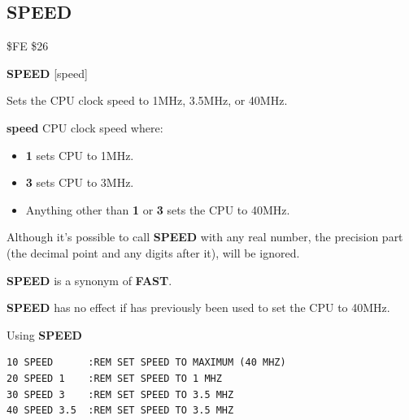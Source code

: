 
\newpage
\subsection{SPEED}
\begin{description}[leftmargin=2cm,style=nextline]
\item [Token:] \$FE \$26
\item [Format:] {\bf SPEED} [speed]
\item [Usage:] Sets the CPU clock speed to 1MHz, 3.5MHz, or 40MHz.

               {\bf speed} CPU clock speed where:
               \begin{itemize}
                   \item {\bf 1} sets CPU to 1MHz.
                   \item {\bf 3} sets CPU to 3MHz.
                   \item Anything other than {\bf 1} or {\bf 3} sets the CPU to 40MHz.
               \end{itemize}
\item [Remarks:] Although it's possible to call {\bf SPEED}
                 with any real number, the precision part (the decimal point
                 and any digits after it), will be ignored.

                {\bf SPEED} is a synonym of {\bf FAST}.

                {\bf SPEED} has no effect if 
                has previously been used to set the CPU to 40MHz.

\item [Example:] Using {\bf SPEED}
\begin{tcolorbox}[colback=black,coltext=white]
\verbatimfont{\codefont}
\begin{verbatim}
10 SPEED      :REM SET SPEED TO MAXIMUM (40 MHZ)
20 SPEED 1    :REM SET SPEED TO 1 MHZ
30 SPEED 3    :REM SET SPEED TO 3.5 MHZ
40 SPEED 3.5  :REM SET SPEED TO 3.5 MHZ
\end{verbatim}
\end{tcolorbox}
\end{description}


\newpage
